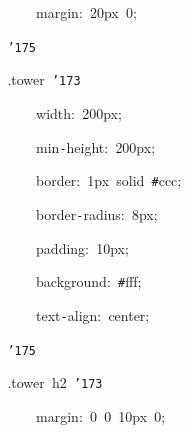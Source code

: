 \documentclass[a4paper,10pt]{article}
\def\mc{\relax}
\begin{document}
\noindent
\mbox{}{\tt\mc \ }{\tt\mc \ }{\tt\mc \ }{\tt\mc \ }{\tt\mc \ }{\tt\mc \ }{\tt\mc \ }{\tt\mc \ }{\tt\mc \ }{\tt\mc \ }{\tt\mc \ }{\tt\mc \ }margin:{\tt\mc \ }20px{\tt\mc \ }0;

\noindent
\mbox{}{\tt\mc \ }{\tt\mc \ }{\tt\mc \ }{\tt\mc \ }{\tt\mc \ }{\tt\mc \ }{\tt\mc \ }{\tt\mc \ }{\tt\char'175}

\noindent
\mbox{}{\tt\mc \ }{\tt\mc \ }{\tt\mc \ }{\tt\mc \ }{\tt\mc \ }{\tt\mc \ }{\tt\mc \ }{\tt\mc \ }.tower{\tt\mc \ }{\tt\char'173}

\noindent
\mbox{}{\tt\mc \ }{\tt\mc \ }{\tt\mc \ }{\tt\mc \ }{\tt\mc \ }{\tt\mc \ }{\tt\mc \ }{\tt\mc \ }{\tt\mc \ }{\tt\mc \ }{\tt\mc \ }{\tt\mc \ }width:{\tt\mc \ }200px;

\noindent
\mbox{}{\tt\mc \ }{\tt\mc \ }{\tt\mc \ }{\tt\mc \ }{\tt\mc \ }{\tt\mc \ }{\tt\mc \ }{\tt\mc \ }{\tt\mc \ }{\tt\mc \ }{\tt\mc \ }{\tt\mc \ }min{\tt -}height:{\tt\mc \ }200px;

\noindent
\mbox{}{\tt\mc \ }{\tt\mc \ }{\tt\mc \ }{\tt\mc \ }{\tt\mc \ }{\tt\mc \ }{\tt\mc \ }{\tt\mc \ }{\tt\mc \ }{\tt\mc \ }{\tt\mc \ }{\tt\mc \ }border:{\tt\mc \ }1px{\tt\mc \ }solid{\tt\mc \ }{\tt\#}ccc;

\noindent
\mbox{}{\tt\mc \ }{\tt\mc \ }{\tt\mc \ }{\tt\mc \ }{\tt\mc \ }{\tt\mc \ }{\tt\mc \ }{\tt\mc \ }{\tt\mc \ }{\tt\mc \ }{\tt\mc \ }{\tt\mc \ }border{\tt -}radius:{\tt\mc \ }8px;

\noindent
\mbox{}{\tt\mc \ }{\tt\mc \ }{\tt\mc \ }{\tt\mc \ }{\tt\mc \ }{\tt\mc \ }{\tt\mc \ }{\tt\mc \ }{\tt\mc \ }{\tt\mc \ }{\tt\mc \ }{\tt\mc \ }padding:{\tt\mc \ }10px;

\noindent
\mbox{}{\tt\mc \ }{\tt\mc \ }{\tt\mc \ }{\tt\mc \ }{\tt\mc \ }{\tt\mc \ }{\tt\mc \ }{\tt\mc \ }{\tt\mc \ }{\tt\mc \ }{\tt\mc \ }{\tt\mc \ }background:{\tt\mc \ }{\tt\#}fff;

\noindent
\mbox{}{\tt\mc \ }{\tt\mc \ }{\tt\mc \ }{\tt\mc \ }{\tt\mc \ }{\tt\mc \ }{\tt\mc \ }{\tt\mc \ }{\tt\mc \ }{\tt\mc \ }{\tt\mc \ }{\tt\mc \ }text{\tt -}align:{\tt\mc \ }center;

\noindent
\mbox{}{\tt\mc \ }{\tt\mc \ }{\tt\mc \ }{\tt\mc \ }{\tt\mc \ }{\tt\mc \ }{\tt\mc \ }{\tt\mc \ }{\tt\char'175}

\noindent
\mbox{}{\tt\mc \ }{\tt\mc \ }{\tt\mc \ }{\tt\mc \ }{\tt\mc \ }{\tt\mc \ }{\tt\mc \ }{\tt\mc \ }.tower{\tt\mc \ }h2{\tt\mc \ }{\tt\char'173}

\noindent
\mbox{}{\tt\mc \ }{\tt\mc \ }{\tt\mc \ }{\tt\mc \ }{\tt\mc \ }{\tt\mc \ }{\tt\mc \ }{\tt\mc \ }{\tt\mc \ }{\tt\mc \ }{\tt\mc \ }{\tt\mc \ }margin:{\tt\mc \ }0{\tt\mc \ }0{\tt\mc \ }10px{\tt\mc \ }0;
\end{document}

